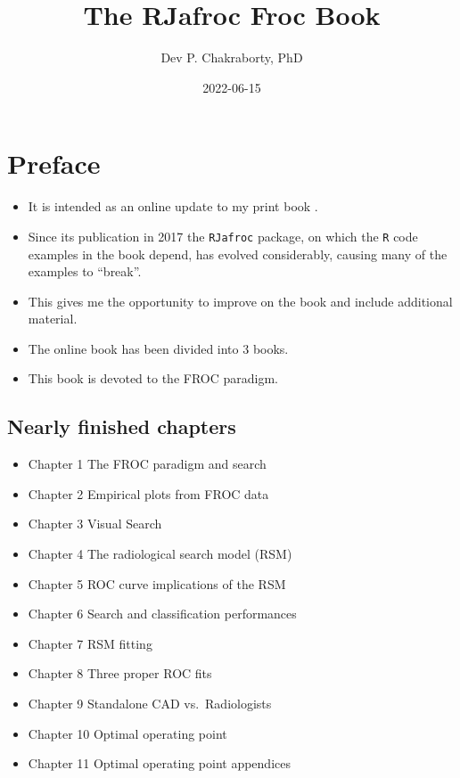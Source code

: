 \documentclass[
]{book}
\title{The RJafroc Froc Book}
\author{Dev P. Chakraborty, PhD}
\date{2022-06-15}
\providecommand{\tightlist}{%
  \setlength{\itemsep}{0pt}\setlength{\parskip}{0pt}}
\begin{document}
\maketitle

{
\setcounter{tocdepth}{1}
\tableofcontents
}
\hypertarget{preface}{%
\chapter*{Preface}\label{preface}}

\begin{itemize}
\tightlist
\item
  It is intended as an online update to my print book \citep{chakraborty2017observer}.
\item
  Since its publication in 2017 the \texttt{RJafroc} package, on which the \texttt{R} code examples in the book depend, has evolved considerably, causing many of the examples to ``break''.
\item
  This gives me the opportunity to improve on the book and include additional material.
\item
  The online book has been divided into 3 books.
\item
  This book is devoted to the FROC paradigm.
\end{itemize}

\hypertarget{nearly-finished-chapters}{%
\section*{Nearly finished chapters}\label{nearly-finished-chapters}}

\begin{itemize}
\tightlist
\item
  Chapter 1 The FROC paradigm and search
\item
  Chapter 2 Empirical plots from FROC data
\item
  Chapter 3 Visual Search
\item
  Chapter 4 The radiological search model (RSM)
\item
  Chapter 5 ROC curve implications of the RSM
\item
  Chapter 6 Search and classification performances
\item
  Chapter 7 RSM fitting
\item
  Chapter 8 Three proper ROC fits
\item
  Chapter 9 Standalone CAD vs.~Radiologists
\item
  Chapter 10 Optimal operating point
\item
  Chapter 11 Optimal operating point appendices
\end{itemize}
\end{document}
